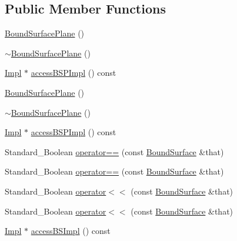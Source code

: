 \subsection*{Public Member Functions}
\begin{DoxyCompactItemize}
\item 
\hyperlink{classMcCAD_1_1Geometry_1_1BoundSurfacePlane_aae9af5a7f31d48a6293c236525831587}{Bound\+Surface\+Plane} ()
\item 
\hyperlink{classMcCAD_1_1Geometry_1_1BoundSurfacePlane_aaa23bc872b8601fb818fe6ddb457beac}{$\sim$\+Bound\+Surface\+Plane} ()
\item 
\hyperlink{classMcCAD_1_1Geometry_1_1BoundSurfacePlane_1_1Impl}{Impl} $\ast$ \hyperlink{classMcCAD_1_1Geometry_1_1BoundSurfacePlane_a81a714b3b2d58f42eeec6ec9ba300b3d}{access\+B\+S\+P\+Impl} () const
\item 
\hyperlink{classMcCAD_1_1Geometry_1_1BoundSurfacePlane_aae9af5a7f31d48a6293c236525831587}{Bound\+Surface\+Plane} ()
\item 
\hyperlink{classMcCAD_1_1Geometry_1_1BoundSurfacePlane_aaa23bc872b8601fb818fe6ddb457beac}{$\sim$\+Bound\+Surface\+Plane} ()
\item 
\hyperlink{classMcCAD_1_1Geometry_1_1BoundSurfacePlane_1_1Impl}{Impl} $\ast$ \hyperlink{classMcCAD_1_1Geometry_1_1BoundSurfacePlane_a732e43c447773423af23331af5f18da0}{access\+B\+S\+P\+Impl} () const
\item 
Standard\+\_\+\+Boolean \hyperlink{classMcCAD_1_1Geometry_1_1BoundSurface_a5c7eafa600bd89b55fa06ddb9b21cc08}{operator==} (const \hyperlink{classMcCAD_1_1Geometry_1_1BoundSurface}{Bound\+Surface} \&that)
\item 
Standard\+\_\+\+Boolean \hyperlink{classMcCAD_1_1Geometry_1_1BoundSurface_a5c7eafa600bd89b55fa06ddb9b21cc08}{operator==} (const \hyperlink{classMcCAD_1_1Geometry_1_1BoundSurface}{Bound\+Surface} \&that)
\item 
Standard\+\_\+\+Boolean \hyperlink{classMcCAD_1_1Geometry_1_1BoundSurface_a2443caf3cbbe81e666df60745a92db28}{operator$<$$<$} (const \hyperlink{classMcCAD_1_1Geometry_1_1BoundSurface}{Bound\+Surface} \&that)
\item 
Standard\+\_\+\+Boolean \hyperlink{classMcCAD_1_1Geometry_1_1BoundSurface_a2443caf3cbbe81e666df60745a92db28}{operator$<$$<$} (const \hyperlink{classMcCAD_1_1Geometry_1_1BoundSurface}{Bound\+Surface} \&that)
\item 
\hyperlink{classMcCAD_1_1Geometry_1_1BoundSurfacePlane_1_1Impl}{Impl} $\ast$ \hyperlink{classMcCAD_1_1Geometry_1_1BoundSurface_aaf5a1d89894e9a90fee2e1f355638d0b}{access\+B\+S\+Impl} () const

\end{DoxyCompactItemize}
